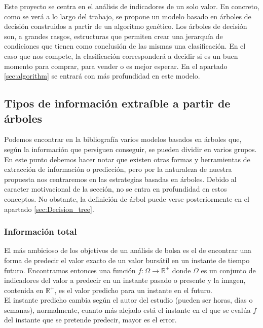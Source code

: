 Este proyecto se centra en el an\'alisis de indicadores de un solo valor. En concreto, como se ver\'a a lo largo del trabajo, se propone un modelo basado en \'arboles de decisi\'on construidos a partir de un algoritmo gen\'etico. Los \'arboles de decisi\'on son, a grandes rasgos, estructuras que permiten crear una jerarqu\'ia de condiciones que tienen como conclusi\'on de las mismas una clasificaci\'on. En el caso que nos compete, la clasificaci\'on corresponder\'a a decidir si es un buen momento para comprar, para vender o es mejor esperar. En el apartado \ref{sec:algorithm} se entrar\'a con m\'as profundidad en este modelo. \\



\subsection{Tipos de informaci\'on extra\'ible a partir de \'arboles}
Podemos encontrar en la bibliograf\'ia varios modelos basados en \'arboles que, seg\'un la informaci\'on que persiguen conseguir, se pueden dividir en varios grupos. En este punto debemos hacer notar que existen otras formas y herramientas de extracci\'on de informaci\'on o predicci\'on, pero por la naturaleza de nuestra propuesta nos centraremos en las estrategias basadas en \'arboles. Debido al caracter motivacional de la secci\'on, no se entra en profundidad en estos conceptos. No obstante, la definici\'on de \'arbol puede verse posteriormente en el apartado \ref{sec:Decision_tree}.

    \subsubsection{Informaci\'on total}
    
    El m\'as ambicioso de los objetivos de un an\'alisis de bolsa es el de encontrar una forma de predecir el valor exacto de un valor burs\'atil en un instante de tiempo futuro. Encontramos entonces una funci\'on $f:\Omega \rightarrow \mathbb{R}^+$ donde $\Omega$ es un conjunto de indicadores del valor a predecir en un instante pasado o presente y la imagen, contenida en $\mathbb{R}^+$, es el valor predicho para un instante en el futuro.\\
    
    El instante predicho cambia seg\'un el autor del estudio (pueden ser horas, d\'ias o semanas), normalmente, cuanto m\'as alejado est\'a el instante en el que se eval\'ua $f$ del instante que se pretende predecir, mayor es el error.\\
    
